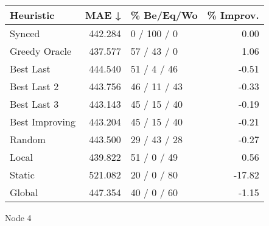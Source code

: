 \begin{tabular}{lrlr}
\toprule
\textbf{Heuristic} & \textbf{MAE ↓} & \textbf{\% Be/Eq/Wo} & \textbf{\% Improv.} \\
\midrule
            Synced &        442.284 &          0 / 100 / 0 &                0.00 \\
     Greedy Oracle &        437.577 &          57 / 43 / 0 &                1.06 \\
         Best Last &        444.540 &          51 / 4 / 46 &               -0.51 \\
       Best Last 2 &        443.756 &         46 / 11 / 43 &               -0.33 \\
       Best Last 3 &        443.143 &         45 / 15 / 40 &               -0.19 \\
    Best Improving &        443.204 &         45 / 15 / 40 &               -0.21 \\
            Random &        443.500 &         29 / 43 / 28 &               -0.27 \\
             Local &        439.822 &          51 / 0 / 49 &                0.56 \\
            Static &        521.082 &          20 / 0 / 80 &              -17.82 \\
            Global &        447.354 &          40 / 0 / 60 &               -1.15 \\
\bottomrule
\end{tabular}
\caption{Node 4}
\label{tab:iid_lr05_le2_bs4_4}
